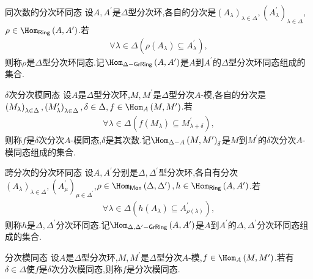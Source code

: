 \begin{definition}{同次数的分次环同态}{}
	设$A,A^{\prime}$是$\Delta$型分次环,各自的分次是$\left(A_{\lambda}\right)_{\lambda\in\Delta},\left(A_{\lambda}^{\prime}\right)_{\lambda\in\Delta}$,$\rho\in\Hom_{\mathsf{Ring}}\left(A,A^{\prime}\right)$.若
	\begin{align*}
		\forall\lambda\in\Delta\left(\rho\left(A_{\lambda}\right)\subseteq A_{\lambda}^{\prime}\right),
	\end{align*}
	则称$\rho$是$\Delta$型分次环同态.记$\Hom_{\Delta-\mathsf{GrRing}}\left(A,A^{\prime}\right)$是$A$到$A^{\prime}$的$\Delta$型分次环同态组成的集合.
\end{definition}

\begin{definition}{$\delta$次分次模同态}{}
	设$A$是$\Delta$型分次环,$M,M^{\prime}$是$\Delta$型分次$A$-模,各自的分次是$\left(M_{\lambda}\right)_{\lambda\in\Delta},\left(M_{\lambda}^{\prime}\right)_{\lambda\in\Delta},\delta\in\Delta,f\in\Hom_{A}\left(M,M^{\prime}\right)$.若
	\begin{align*}
		\forall\lambda\in\Delta\left(f\left(M_{\lambda}\right)\subseteq M_{\lambda+\delta}^{\prime}\right),
	\end{align*}
	则称$f$是$\delta$次分次$A$-模同态,$\delta$是其次数.记$\Hom_{\Delta-A}\left(M,M^{\prime}\right)_{\delta}$是$M$到$M^{\prime}$的$\delta$次分次$A$-模同态组成的集合.
\end{definition}

\begin{definition}{跨分次的分次环同态}{}
	设$A,A^{\prime}$分别是$\Delta,\Delta^{\prime}$型分次环,各自有分次$\left(A_{\lambda}\right)_{\lambda\in\Delta},\left(A_{\mu}^{\prime}\right)_{\mu\in\Delta^{\prime}}$,$\rho\in\Hom_{\mathsf{Mon}}\left(\Delta,\Delta^{\prime}\right),h\in\Hom_{\mathsf{Ring}}\left(A,A^{\prime}\right)$.若
	\begin{align*}
		\forall\lambda\in\Delta\left(h\left(A_{\lambda}\right)\subseteq A_{\rho\left(\lambda\right)}^{\prime}\right),
	\end{align*}
	则称$h$是$\Delta,\Delta^{\prime}$分次环同态.记$\Hom_{\Delta,\Delta^{\prime}-\mathsf{GrRing}}\left(A,A^{\prime}\right)$是$A$到$A^{\prime}$的$\Delta,\Delta^{\prime}$分次环同态组成的集合.
\end{definition}

\begin{definition}{分次模同态}{}
	设$A$是$\Delta$型分次环,$M,M^{\prime}$是$\Delta$型分次$A$-模,$f\in\Hom_{A}\left(M,M^{\prime}\right)$.若有$\delta\in\Delta$使$f$是$\delta$次分次模同态,则称$f$是分次模同态.
\end{definition}

